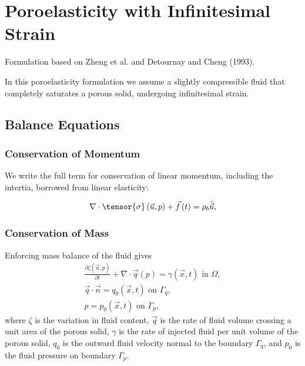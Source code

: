 \section{Poroelasticity with Infinitesimal Strain}

Formulation based on Zheng et al. and Detournay and Cheng (1993).

In this poroelasticity formulation we assume a slightly compressible fluid that
completely saturates a porous solid, undergoing infinitesimal
strain.

\subsection{Balance Equations}

\subsubsection{Conservation of Momentum}

We write the full term for conservation of linear momentum, including the intertia,
borrowed from linear elasticity:

\begin{gather}
    \nabla \cdot \tensor{\sigma}\left(\vec{u},p\right) + \vec{f}\left(t\right) = \rho_{b}\ddot{\vec{u}},
\end{gather}

\subsubsection{Conservation of Mass}

Enforcing mass balance of the fluid gives
\begin{gather}
  \frac{\partial \zeta(\vec{u},p)}{\partial t} + \nabla \cdot \vec{q}(p) =
  \gamma(\vec{x},t) \text{ in } \Omega, \\
%
  \vec{q} \cdot \vec{n} = q_0(\vec{x},t) \text{ on }\Gamma_q, \\
%
  p = p_0(\vec{x},t) \text{ on }\Gamma_p,
\end{gather}
where $\zeta$ is the variation in fluid content, $\vec{q}$ is the rate
of fluid volume crossing a unit area of the porous solid, $\gamma$ is
the rate of injected fluid per unit volume of the porous solid, $q_0$
is the outward fluid velocity normal to the boundary $\Gamma_q$, and
$p_0$ is the fluid pressure on boundary $\Gamma_p$.\\

